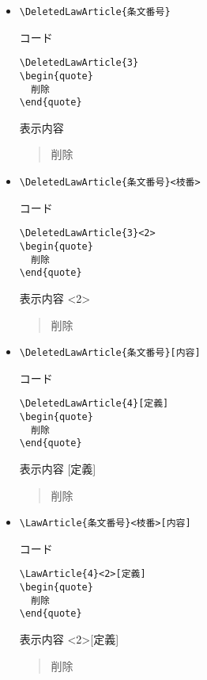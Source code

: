 \documentclass[oneside,10pt,a4paper]{jsarticle}
\begin{document}
  \begin{itemize}
    \item \verb|\DeletedLawArticle{条文番号}|
      \begin{itembox}[l]{コード}
        {\footnotesize\begin{verbatim}
\DeletedLawArticle{3}
\begin{quote}
  削除
\end{quote}\end{verbatim}}
      \end{itembox}
      \begin{itembox}[l]{表示内容}
        \begin{quote}
          削除
        \end{quote}
      \end{itembox}
    \item \verb|\DeletedLawArticle{条文番号}<枝番>|
      \begin{itembox}[l]{コード}
        {\footnotesize\begin{verbatim}
\DeletedLawArticle{3}<2>
\begin{quote}
  削除
\end{quote}\end{verbatim}}
      \end{itembox}
      \begin{itembox}[l]{表示内容}
        <2>
        \begin{quote}
          削除
        \end{quote}
      \end{itembox}
    \newpage
    \item \verb|\DeletedLawArticle{条文番号}[内容]|
      \begin{itembox}[l]{コード}
        {\footnotesize\begin{verbatim}
\DeletedLawArticle{4}[定義]
\begin{quote}
  削除
\end{quote}\end{verbatim}}
      \end{itembox}
      \begin{itembox}[l]{表示内容}
        [定義]
        \begin{quote}
          削除
        \end{quote}
      \end{itembox}
    \item \verb|\LawArticle{条文番号}<枝番>[内容]|
      \begin{itembox}[l]{コード}
        {\footnotesize\begin{verbatim}
\LawArticle{4}<2>[定義]
\begin{quote}
  削除
\end{quote}\end{verbatim}}
      \end{itembox}
      \begin{itembox}[l]{表示内容}
        <2>[定義]
        \begin{quote}
          削除
        \end{quote}
      \end{itembox}
  \end{itemize}
\end{document}
